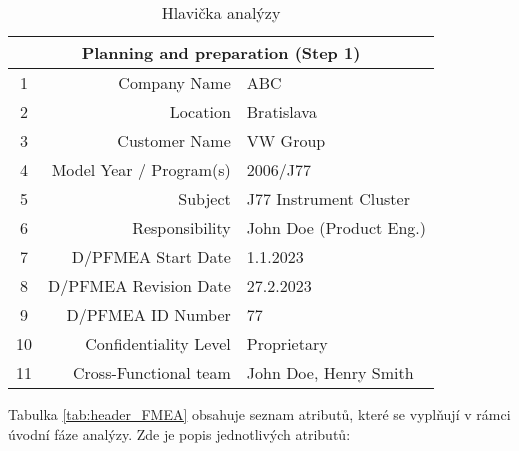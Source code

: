 \begin{center}
\begin{table}[h]
	\centering
	\caption{Hlavička analýzy}
 \label{tab:header_FMEA}
	\label{tab:Head1}
        \begin{tabular}{|c | r | l |} 
         \hline
 \multicolumn{3}{|c|}{Planning and preparation (Step 1)} \\

         \hline
         1 & Company Name & ABC  \\ [0.5ex] 
         \hline
         2 & Location & Bratislava  \\ [0.5ex] 
         \hline
         3 & Customer Name & VW Group  \\ [0.5ex] 
         \hline
         4 & Model Year / Program(s) & 2006/J77 \\ [0.5ex] 
         \hline
         5 & Subject & J77 Instrument Cluster \\ [0.5ex] 
         \hline
         6 & Responsibility & John Doe (Product Eng.) \\ [0.5ex] 
         \hline
         7 & D/PFMEA Start Date & 1.1.2023  \\ [0.5ex] 
         \hline
         8 & D/PFMEA Revision Date & 27.2.2023 \\ [0.5ex] 
         \hline
         9 & D/PFMEA ID Number & 77 \\ [0.5ex] 
         \hline
         10 & Confidentiality Level & Proprietary \\ [0.5ex] 
         \hline
         11 & Cross-Functional team & John Doe, Henry Smith \\ [0.5ex] 
         \hline
        \end{tabular}
    \end{table}
\end{center}

Tabulka \ref{tab:header_FMEA} obsahuje seznam atributů, které se vyplňují v rámci úvodní fáze analýzy. Zde je popis jednotlivých atributů:

